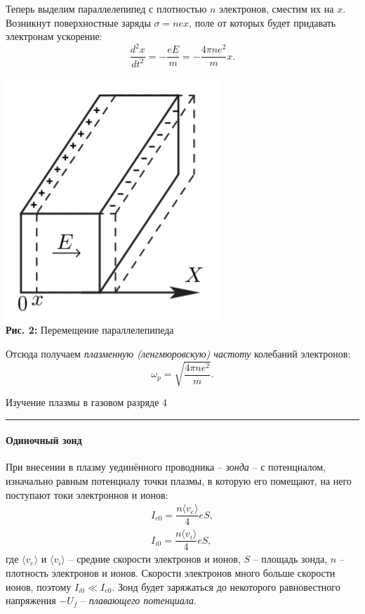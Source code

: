 \documentclass[12pt,a4paper]{scrartcl}
\begin{document}
Теперь выделим параллелепипед с плотностью $n$ электронов, сместим их на $x$. Возникнут поверхностные заряды $\sigma = nex$, поле от которых будет придавать электронам ускорение:
$$
\dfrac{d^2x}{dt^2}=-\dfrac{eE}{m}=-\dfrac{4\pi n e^2}{m}x.
$$ 

\begin{center}
	\includegraphics[scale=0.5]{PIC_2.png}
	\\\textbf{Рис. 2:} Перемещение параллелепипеда
\end{center}
Отсюда получаем \textit{плазменную (ленгмюровскую) частоту} колебаний электронов:
\begin{equation}
\omega_p = \sqrt{\dfrac{4\pi ne^2}{m}}.
\end{equation}	

	\newpage


	\begin{flushleft}
		\footnotesize{Изучение плазмы в газовом разряде} \hspace{\fill} \footnotesize{4}
		\\[-0.3cm]\noindent\rule{\textwidth}{0.3pt}
	\end{flushleft}	
		
\paragraph{Одиночный зонд} \hfill

При внесении в плазму уединённого проводника -- \textit{зонда} -- с потенциалом, изначально равным потенциалу точки плазмы, в которую его помещают, на него поступают токи электроннов и ионов:
\begin{equation}
\begin{array}{c}
I_{e0} = \dfrac{n \langle v_e \rangle}{4}eS,\\
I_{i0} = \dfrac{n \langle v_i \rangle}{4}eS,
\end{array}
\end{equation}
где $\langle v_e \rangle$ и $\langle v_i \rangle$ -- средние скорости электронов и ионов, $S$ -- площадь зонда, $n$ -- плотность электронов и ионов. Скорости электронов много больше скорости ионов, поэтому $I_{i0} \ll I_{e0}$. Зонд будет заряжаться до некоторого равновестного напряжения $-U_f$ -- \textit{плавающего потенциала}.\\ 
\end{document}
